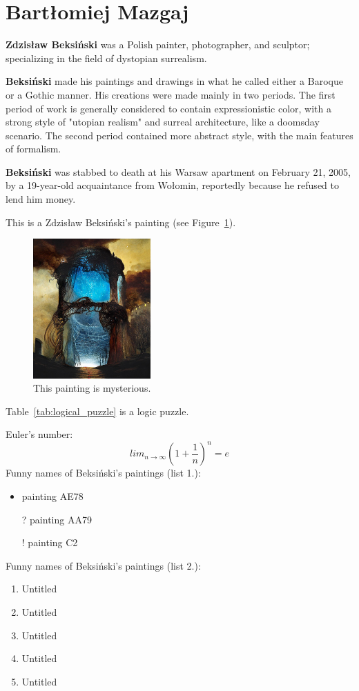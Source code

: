 \section{Bartłomiej Mazgaj}
\setlength{\parindent}{20pt}


\textbf{Zdzisław Beksiński} was a Polish painter, photographer, and sculptor; specializing in the field of dystopian surrealism.\par
\textbf{Beksiński} made his paintings and drawings in what he called either a Baroque or a Gothic manner. His creations were made mainly in two periods. The first period of work is generally considered to contain expressionistic color, with a strong style of "utopian realism" and surreal architecture, like a doomsday scenario. The second period contained more abstract style, with the main features of formalism.\par
\textbf{Beksiński} was stabbed to death at his Warsaw apartment on February 21, 2005, by a 19-year-old acquaintance from Wołomin, reportedly because he refused to lend him money. 

\vspace{5mm}
This is a Zdzisław Beksiński's painting (see Figure~\ref{fig:beksinski}).

\begin{figure}[htbp] 
    \centering
    \includegraphics[width=0.4\textwidth]{pictures/Beksinski.jpg} 
    \caption{This painting is mysterious.}
    \label{fig:beksinski}
\end{figure}

Table~\ref{tab:logical_puzzle} is a logic puzzle. 


Euler's number: \[ lim_{n \to \infty }\left ( 1+\frac{1}{n} \right )^{n}= e \]
\newpage 
Funny names of Beksiński's paintings (list 1.):

\begin{itemize}
    \item    painting AE78
    \item[?] painting AA79
    \item[!] painting C2
\end{itemize}

\vspace{5mm}

Funny names of Beksiński's paintings (list 2.):
\begin{enumerate}
    \item Untitled
    \item Untitled
    \item Untitled
    \item Untitled
    \item Untitled
\end{enumerate}

    
   
   
  


